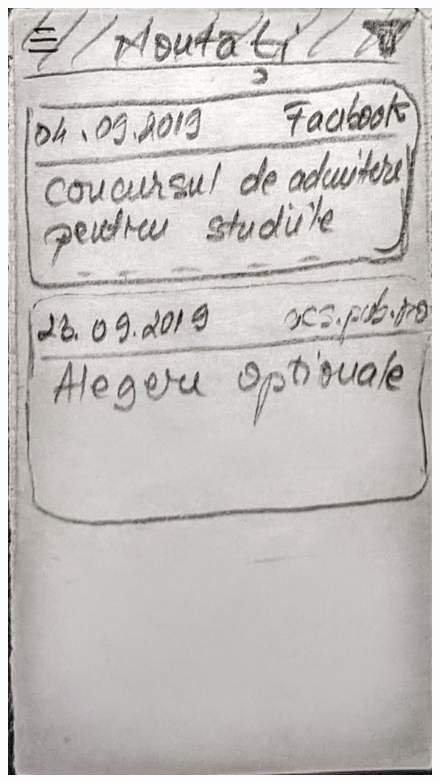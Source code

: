 \begin{figure}[ht]
         \includegraphics[height=0.279\textheight]{figures/app/paper/news.jpg}

\end{figure}
